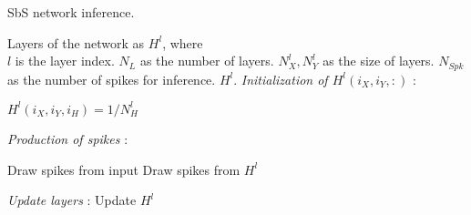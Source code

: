 \section*{}
\subsection{}
\label{sec:appendix_sbs_algorithm}


\begin{algorithm}[h!]
	\label{alg:inference}
	\caption{SbS network inference.}
	
	\begin{algorithmic}[1]
		\SetAlgoLined
		\renewcommand{\algorithmicrequire}{\textbf{input:}}
		\renewcommand{\algorithmicensure}{\textbf{output:}}
		\REQUIRE Layers of the network as $H^l$, where\\
		$l$ is the layer index.
		\REQUIRE $N_{L}$ as the number of layers.
		\REQUIRE $N^l_{X}, N^l_{Y}$ as the size of layers.
		\REQUIRE $N_{Spk}$ as the number of spikes for inference.
		\ENSURE $H^l$.
		\textit{Initialization of $H^l(i_X,i_Y,:)$} :
		
		\STATE $H^l(i_X,i_Y,i_{H}) = 1/N^l_H$
		\ENDFOR
		\ENDFOR
		\ENDFOR
		\ENDIF
		
		\textit{Production of spikes} :
		
		\STATE Draw spikes from input 
		\ELSE
		\STATE Draw spikes from $H^l$ 
		\ENDIF
		
		\ENDFOR
		
		\textit{Update layers} :
		\STATE Update $H^l$ 
		\ENDFOR
		
		\ENDFOR
	\end{algorithmic} 
\end{algorithm}


